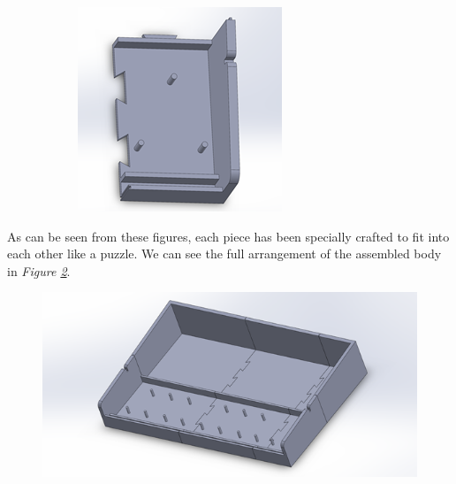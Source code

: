 \begin{figure}[h!]
    \begin{subfigure}[b]{0.45\textwidth}
      \centering
      \includegraphics[width=\textwidth]{image/BodyModel8.png}
    \end{subfigure}
    \caption{}
    \label{fig:body_parts}
\end{figure}

As can be seen from these figures, each piece has been specially crafted to fit into each other like a puzzle. We can see the full arrangement of the assembled body in \textit{Figure \ref{fig:assembled_body}}.

\begin{figure}[h!]
  \centering
  \includegraphics[width=0.9\linewidth]{image/AssembledBody.png}
  \caption{}
  \label{fig:assembled_body}
\end{figure}

